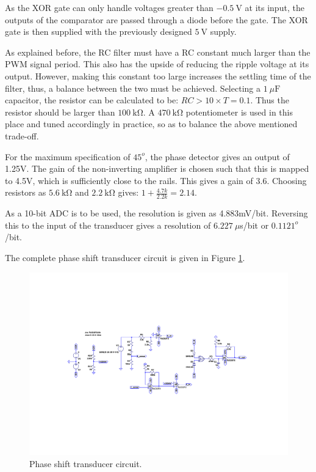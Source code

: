 As the XOR gate can only handle voltages greater than $\SI{-0.5}{\volt}$ at its input\cite{XOR}, the outputs of the comparator are passed through a diode before the gate. The XOR gate is then supplied with the previously designed $\SI{+5}{\volt}$ supply.

As explained before, the RC filter must have a RC constant much larger than the PWM signal period. This also has the upside of reducing the ripple voltage at its output. However, making this constant too large increases the settling time of the filter, thus, a balance between the two must be achieved. Selecting a $\SI{1}{\mu\farad}$ capacitor, the resistor can be calculated to be: $RC > 10 \times T = 0.1$. Thus the resistor should be larger than $\SI{100}{\kilo\ohm}$. A $\SI{470}{\kilo\ohm}$ potentiometer is used in this place and tuned accordingly in practice, so as to balance the above mentioned trade-off.


For the maximum specification of $45^o$, the phase detector gives an output of 1.25V. The gain of the non-inverting amplifier is chosen such that this is mapped to 4.5V, which is sufficiently close to the rails. This gives a gain of 3.6. Choosing resistors as $\SI{5.6}{\kilo\ohm}$ and $\SI{2.2}{\kilo\ohm}$ gives: $1+\frac{4.7k}{2.2k} = 2.14$.

As a 10-bit ADC is to be used, the resolution is given as 4.883mV/bit. Reversing this to the input of the transducer gives a resolution of $\SI{6.227}{\mu}$s/bit or $0.1121^o$/bit.

The complete phase shift transducer circuit is given in Figure \ref{fig:phase_circuit}.

\begin{figure}
        \centering
         \includegraphics[width=1.15\linewidth,clip, trim = 3cm 3cm 0cm 3cm]{./Figures/phase_circuit.pdf}
		    \caption{Phase shift transducer circuit.} \label{fig:phase_circuit}
 \end{figure}

